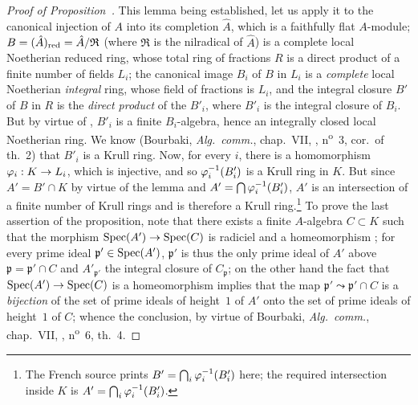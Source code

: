 \begin{proof}[Proof of Proposition~{\rm{}}]
This lemma being established, let us apply it to the canonical injection of $A$ into its completion $\hat{A}$, which is a faithfully flat $A$-module; $B=(\hat{A})_{\mathrm{red}}=\hat{A}/\mathfrak{R}$ (where $\mathfrak{R}$ is the nilradical of $\hat{A}$) is a complete local Noetherian reduced ring, whose total ring of
fractions $R$ is a direct product of a finite number of fields $L_i$; the canonical image $B_i$ of $B$ in $L_i$ is a \emph{complete} local Noetherian \emph{integral} ring, whose field of fractions is $L_i$, and the integral closure $B'$ of $B$ in $R$ is the \emph{direct product} of the $B'_i$, where $B'_i$ is the integral closure of $B_i$.
But by virtue of , $B'_i$ is a finite $B_i$-algebra, hence an integrally closed local Noetherian ring.
We know (Bourbaki, \emph{Alg.~comm.}, chap.~VII, , n\textsuperscript{o}~3, cor.~of th.~2) that $B'_i$ is a Krull ring.
Now, for every $i$, there is a homomorphism $\varphi_i:K\to L_i$, which is injective, and so $\varphi_i^{-1}(B'_i)$ is a Krull ring in $K$.
But since $A'=B'\cap K$ by virtue of the lemma and $A'=\bigcap\varphi_i^{-1}(B'_i)$, $A'$ is an intersection of a finite number of Krull rings and is therefore a Krull ring.\footnote{The French source prints $B'=\bigcap_i\varphi_i^{-1}(B'_i)$ here; the required intersection inside $K$ is $A'=\bigcap_i\varphi_i^{-1}(B'_i)$.}
To prove the last assertion of the proposition, note that there exists a finite $A$-algebra $C\subset K$ such that the morphism $\operatorname{Spec}(A')\to\operatorname{Spec}(C)$ is radiciel and a homeomorphism ; for every prime ideal $\mathfrak{p}'\in\operatorname{Spec}(A')$, $\mathfrak{p}'$ is thus the only prime ideal of $A'$ above $\mathfrak{p}=\mathfrak{p}'\cap C$ and $A'_{\mathfrak{p}'}$ the integral closure of $C_\mathfrak{p}$; on the other hand the fact that $\operatorname{Spec}(A')\to\operatorname{Spec}(C)$ is a homeomorphism implies that the map $\mathfrak{p}'\leadsto\mathfrak{p}'\cap C$ is a \emph{bijection} of the set of prime ideals of height~$1$ of $A'$ onto the set of prime ideals of height~$1$ of $C$; whence the conclusion, by virtue of Bourbaki, \emph{Alg.~comm.}, chap.~VII, , n\textsuperscript{o}~6, th.~4.
\end{proof}


